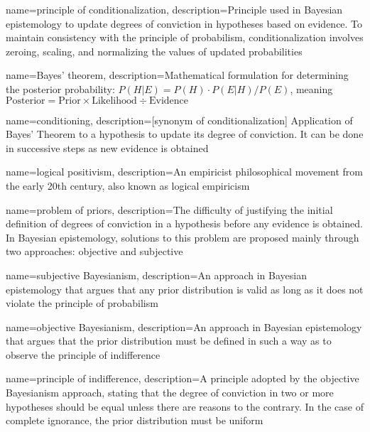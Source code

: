 {
    name=principle of conditionalization,
    description={Principle used in Bayesian epistemology to update degrees of conviction in hypotheses based on evidence. To maintain consistency with the principle of probabilism, conditionalization involves zeroing, scaling, and normalizing the values of updated probabilities}
}

{
    name=Bayes' theorem,
    description={Mathematical formulation for determining the posterior probability: $P(H | E) = P(H) \cdot P(E | H) / P(E)$, meaning $\text{Posterior} = \text{Prior} \times \text{Likelihood} \div \text{Evidence}$}
}

{
    name=conditioning,
    description={[synonym of conditionalization] Application of Bayes' Theorem to a hypothesis to update its degree of conviction. It can be done in successive steps as new evidence is obtained}
}

{
    name=logical positivism,
    description={An empiricist philosophical movement from the early 20th century, also known as logical empiricism}
}

{
    name=problem of priors,
    description={The difficulty of justifying the initial definition of degrees of conviction in a hypothesis before any evidence is obtained. In Bayesian epistemology, solutions to this problem are proposed mainly through two approaches: objective and subjective}
}

{
    name=subjective Bayesianism,
    description={An approach in Bayesian epistemology that argues that any prior distribution is valid as long as it does not violate the principle of probabilism}
}

{
    name=objective Bayesianism,
    description={An approach in Bayesian epistemology that argues that the prior distribution must be defined in such a way as to observe the principle of indifference}
}

{
    name=principle of indifference,
    description={A principle adopted by the objective Bayesianism approach, stating that the degree of conviction in two or more hypotheses should be equal unless there are reasons to the contrary. In the case of complete ignorance, the prior distribution must be uniform}
}

